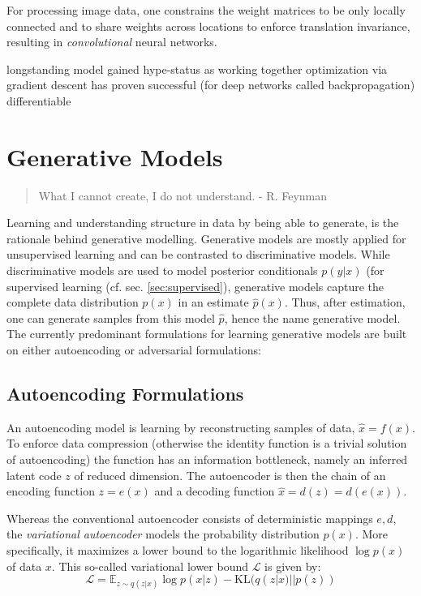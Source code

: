 		For processing image data, one constrains the weight matrices to be only locally connected and to share weights across locations to enforce translation invariance, resulting in \textit{convolutional} neural networks.

		longstanding model gained hype-status as working together
		optimization via gradient descent has proven successful (for deep networks called backpropagation)
		differentiable

\section{Generative Models}\label{sec:genmodel}
	\begin{quote}
	    What I cannot create, I do not understand. - R. Feynman
	\end{quote}
	Learning and understanding structure in data by being able to generate, is the rationale behind generative modelling.
	Generative models are mostly applied for unsupervised learning and can be contrasted to discriminative models. While discriminative models are used to model posterior conditionals $p(y|x)$ (\eg for supervised learning (cf. sec. \ref{sec:supervised}), generative models capture the complete data distribution $p(x)$ in an estimate $\hat p(x)$. Thus, after estimation, one can generate samples from this model $\hat p$, hence the name generative model.
	The currently predominant formulations for learning generative models are built on either autoencoding or adversarial formulations:

	\subsection{Autoencoding Formulations}\label{sec:autoencoding}
		An autoencoding model is learning by reconstructing samples of data, $\hat x = f(x)$. To enforce data compression (otherwise the identity function is a trivial solution of autoencoding) the function has an information bottleneck, namely an inferred latent code $z$ of reduced dimension. The autoencoder is then the chain of an encoding function $z = e(x)$ and a decoding function $\hat x = d(z) = d(e(x))$.

		Whereas the conventional autoencoder consists of deterministic mappings $e, d$, the \textit{variational autoencoder} models the probability distribution $p(x)$. More specifically, it maximizes a lower bound to the logarithmic likelihood $\log p(x)$ of data $x$. This so-called variational lower bound $\mathcal{L}$ is given by:
		\begin{equation}\label{eq:vae}
			\mathcal{L} = \mathds{E}_{z\sim q(z|x)}  \log p(x|z) - \textrm{KL}(q(z|x)||p(z))
		\end{equation}


